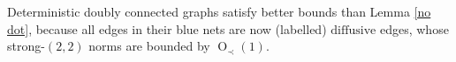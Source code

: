 \documentclass{article}
\newcommand{\1}{\mathds{1}}
\numberwithin{equation}{section}
\newcommand{\ord}{{\rm{ord}}}
\newcommand{\be}{\begin{equation}}
\newcommand{\ee}{\end{equation}}
\newcommand{\e}{{\varepsilon}}
\renewcommand{\cal}{\mathcal}
\renewcommand{\leq}{\leqslant}
\renewcommand{\geq}{\geqslant}
\renewcommand{\le}{\leq}
\renewcommand{\ge}{\geq}
\newcommand{\Z}{\mathbb{Z}}
\newcommand{\dashed}{\text{diffusive}}
\DeclareMathOperator{\OO}{O}
\theoremstyle{plain} %
\newtheorem{lemma}[theorem]{Lemma}
\newtheorem{corollary}[theorem]{Corollary}
\theoremstyle{remark}
\begin{document}
%
%

Deterministic doubly connected graphs satisfy better bounds than Lemma \ref{no dot}, because all edges in their blue nets are now (labelled) $\dashed$ edges, whose strong-$(2,2)$ norms are bounded by $\OO_\prec(1)$. 




\end{document}
